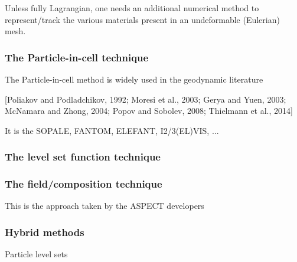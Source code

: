 
Unless fully Lagrangian, one needs an additional numerical method to represent/track
the various materials present in an undeformable (Eulerian) mesh.


\subsubsection{The Particle-in-cell technique}

\cite{galh19}

The Particle-in-cell method is widely used in the geodynamic literature \cite[e.g.][]{popo92}

 [Poliakov and Podladchikov, 1992; Moresi et al., 2003; Gerya and Yuen, 2003; McNamara and
Zhong, 2004; Popov and Sobolev, 2008; Thielmann et al., 2014]

It is the SOPALE, FANTOM, ELEFANT, I2/3(EL)VIS, ...

\subsubsection{The level set function technique}


\subsubsection{The field/composition technique}

This is the approach taken by the ASPECT developers \cite{krhb12,hedg17}


\subsubsection{Hybrid methods}

Particle level sets \cite{brtf08}




